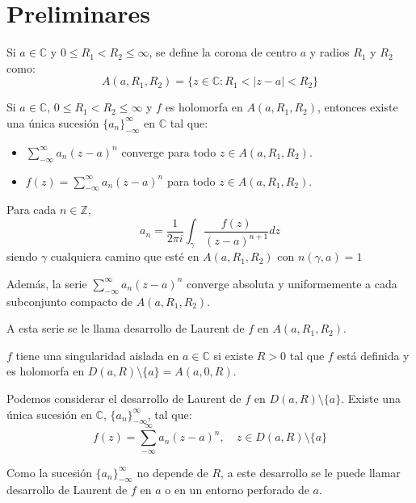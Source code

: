 \chapter*{Preliminares}
\begin{definition}
    Si $a \in \mathbb{C}$ y $0 \leq R_1 < R_2 \leq \infty$, se define la corona de centro $a$ y radios $R_1$ y $R_2$ como:
    $$A(a, R_1, R_2) = \{z \in \mathbb{C} : R_1 < |z-a| < R_2\}$$
\end{definition}

\begin{theorem}
    Si $a \in \mathbb{C}$, $0 \leq R_1 < R_2 \leq \infty$ y $f$ es holomorfa en $A(a, R_1, R_2)$, entonces existe una única sucesión $\{a_n\}_{-\infty}^\infty$ en $\mathbb{C}$ tal que:
    \begin{itemize}
        \item $\sum_{-\infty}^\infty a_n(z-a)^n$ converge para todo $z \in A(a, R_1, R_2)$.
        \item $f(z) = \sum_{-\infty}^\infty a_n(z-a)^n$ para todo $z \in A(a, R_1, R_2)$.
    \end{itemize}

    Para cada $n \in \mathbb{Z}$,
    $$a_n = \frac{1}{2\pi i} \int_\gamma \frac{f(z)}{(z-a)^{n+1}}dz$$
    siendo $\gamma$ cualquiera camino que esté en $A(a, R_1, R_2)$ con $n(\gamma, a) = 1$

    Además, la serie $\sum_{-\infty}^\infty a_n(z-a)^n$ converge absoluta y uniformemente a cada subconjunto compacto de $A(a, R_1, R_2)$.

    A esta serie se le llama desarrollo de Laurent de $f$ en $A(a, R_1, R_2)$.
\end{theorem}

\begin{definition}
    $f$ tiene una singularidad aislada en $a \in \mathbb{C}$ si existe $R > 0$ tal que $f$ está definida y es holomorfa en $D(a, R) \setminus \{a\} = A(a, 0, R)$.
\end{definition}

Podemos considerar el desarrollo de Laurent de $f$ en $D(a, R) \setminus \{a\}$.
Existe una única sucesión en $\mathbb{C}$, $\{a_n\}_{-\infty}^\infty$, tal que:
$$f(z) = \sum_{-\infty}^\infty a_n(z-a)^n, \quad z \in D(a, R) \setminus \{a\}$$

Como la sucesión $\{a_n\}_{-\infty}^\infty$ no depende de $R$, a este desarrollo se le puede llamar desarrollo de Laurent de $f$ en $a$ o en un entorno perforado de $a$.

